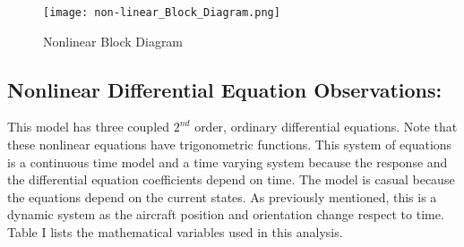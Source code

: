 \documentclass[conference]{IEEEtran}
\begin{document}
\begin{figure}[!h]
\centerline{\texttt{[image: non-linear\_Block\_Diagram.png]}}
\caption{Nonlinear Block Diagram}
\label{figure}
\end{figure}

\subsection{Nonlinear Differential Equation Observations:}
This model has three coupled $2^{nd}$ order, ordinary differential equations. Note that these nonlinear equations have trigonometric functions. This system of equations is a continuous time model and a time varying system because the response and the differential equation coefficients depend on time. The model is casual because the equations depend on the current states. As previously mentioned, this is a dynamic system as the aircraft position and orientation change respect to time. Table I lists the mathematical variables used in this analysis.\\
\end{document}
